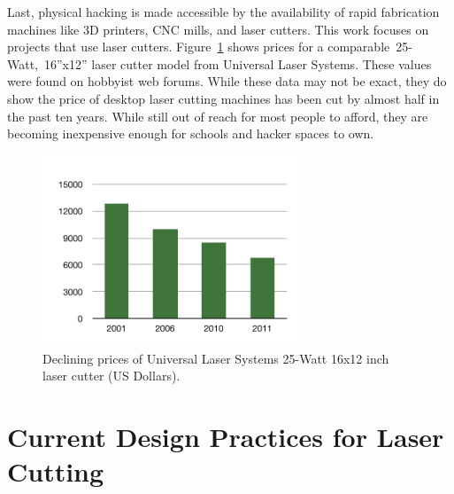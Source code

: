 \documentclass[12pt]{article}
\begin{document}
Last, physical hacking is made accessible by the availability of rapid
fabrication machines like 3D printers, CNC mills, and laser
cutters. This work focuses on projects that use laser
cutters. Figure~\ref{fig:prices} shows prices for a
comparable~25-Watt,~16''x12'' laser cutter model from Universal Laser
Systems. These values were found on hobbyist web forums. While these
data may not be exact, they do show the price of desktop laser cutting
machines has been cut by almost half in the past ten years. While
still out of reach for most people to afford, they are becoming
inexpensive enough for schools and hacker spaces to own.

%

\begin{figure}[h] %
   \centering
   \includegraphics[width=3in]{img/prices.pdf} 
   \caption{Declining prices of Universal Laser Systems 25-Watt 16x12
     inch laser cutter (US Dollars).}
   \label{fig:prices}
\end{figure}

\section{Current Design Practices for Laser Cutting}
\end{document}

